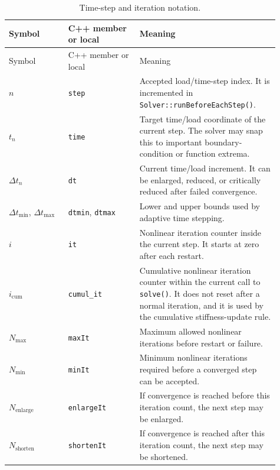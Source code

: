 \documentclass[11pt,a4paper]{article}
\newcommand{\code}[1]{\ifmmode\text{\texttt{\detokenize{#1}}}\else\nolinkurl{#1}\fi}
\begin{document}
\begin{longtable}{p{0.20\linewidth} p{0.24\linewidth} p{0.47\linewidth}}
\caption{Time-step and iteration notation.}
\label{tab:time-notation}\\
\toprule
Symbol & C++ member or local & Meaning \\
\midrule
\endfirsthead
\toprule
Symbol & C++ member or local & Meaning \\
\midrule
\endhead
\(n\) & \code{step} &
Accepted load/time-step index.  It is incremented in
\code{Solver::runBeforeEachStep()}. \\

\(t_n\) & \code{time} &
Target time/load coordinate of the current step.  The solver may snap this to
important boundary-condition or function extrema. \\

\(\Delta t_n\) & \code{dt} &
Current time/load increment.  It can be enlarged, reduced, or critically
reduced after failed convergence. \\

\(\Delta t_{\min}\), \(\Delta t_{\max}\) &
\code{dtmin}, \code{dtmax} &
Lower and upper bounds used by adaptive time stepping. \\

\(i\) & \code{it} &
Nonlinear iteration counter inside the current step.  It starts at zero after
each restart. \\

\(i_{\mathrm{cum}}\) & \code{cumul_it} &
Cumulative nonlinear iteration counter within the current call to
\code{solve()}.  It does not reset after a normal iteration, and it is used by
the cumulative stiffness-update rule. \\

\(N_{\max}\) & \code{maxIt} &
Maximum allowed nonlinear iterations before restart or failure. \\

\(N_{\min}\) & \code{minIt} &
Minimum nonlinear iterations required before a converged step can be accepted. \\

\(N_{\mathrm{enlarge}}\) & \code{enlargeIt} &
If convergence is reached before this iteration count, the next step may be
enlarged. \\

\(N_{\mathrm{shorten}}\) & \code{shortenIt} &
If convergence is reached after this iteration count, the next step may be
shortened. \\
\bottomrule
\end{longtable}
\end{document}

